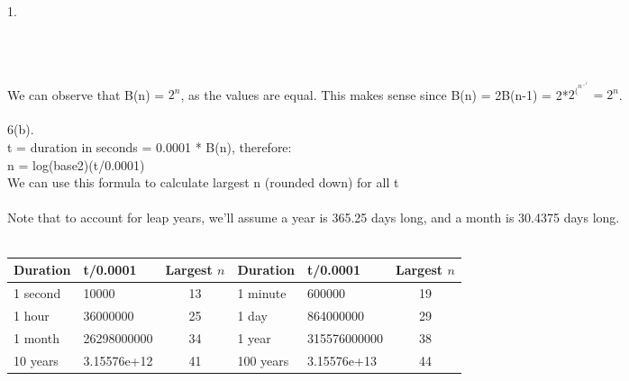 \documentclass[a4paper, 20pt,fleqn]{article}
\begin{document}
\begin{question}{1.}
\begin{tabular}{c c c c}
    \end{tabular}
\\
\\We can observe that B(n) = $2^n$, as the values are equal. This makes sense since B(n) = 2B(n-1) = 2*$2^(^n^-^1^) = 2^n$.
\\
\\6(b).
\\ t = duration in seconds = 0.0001 * B(n), therefore:
\\ n = log(base2)(t/0.0001)
\\We can use this formula to calculate largest n (rounded down) for all t
\\
\\Note that to account for leap years, we'll assume a year is 365.25 days long, and a month is 30.4375 days long.
\\
\\
\begin{tabular}{|l|l|c||l|l|c|}\hline
    Duration &t/0.0001& Largest $n$ & Duration &t/0.0001& Largest $n$ \\ \hline
    1 second & 10000&13 &
    1 minute &600000& 19\\ \hline
    1 hour & 36000000&25 &
    1 day &864000000& 29\\ \hline
    1 month &26298000000&34 &
    1 year & 315576000000&38\\ \hline 
    10 years & 3.15576e+12&41&
    100 years & 3.15576e+13&44\\ \hline
    \end{tabular}
    \newpage
\end{question}
\newpage
\end{document}
